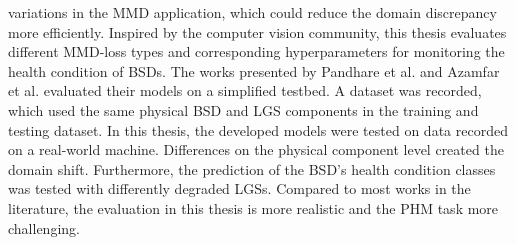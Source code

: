 variations in the MMD application, which could reduce the domain discrepancy more efficiently. Inspired by the computer vision community, this thesis evaluates different MMD-loss types and corresponding hyperparameters for monitoring the health condition of BSDs. The works presented by Pandhare et al. \cite{Pandhare2021} and Azamfar et al. \cite{AZAMFAR2020103932} evaluated their models on a simplified testbed. A dataset was recorded, which used the same physical BSD and LGS components in the training and testing dataset. In this thesis, the developed models were tested on data recorded on a real-world machine. Differences on the physical component level created the domain shift. Furthermore, the prediction of the BSD's health condition classes was tested with differently degraded LGSs. Compared to most works in the literature, the evaluation in this thesis is more realistic and the PHM task more challenging. 
